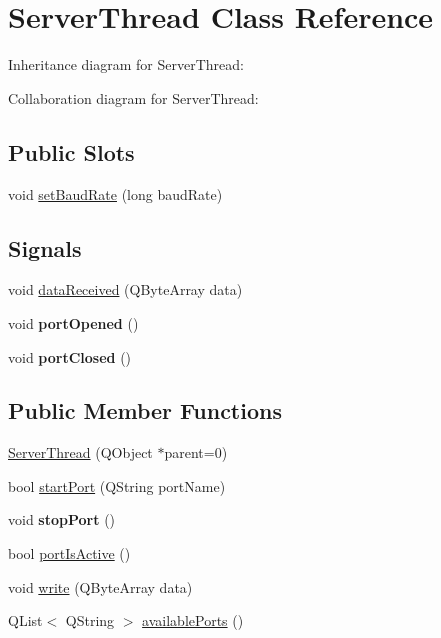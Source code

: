 \hypertarget{classServerThread}{\section{Server\+Thread Class Reference}
\label{classServerThread}
}


Inheritance diagram for Server\+Thread\+:


Collaboration diagram for Server\+Thread\+:
\subsection*{Public Slots}
\begin{DoxyCompactItemize}
\item 
void \hyperlink{classServerThread_a5a2fd84aec757a4475d9bb26ea53e896}{set\+Baud\+Rate} (long baud\+Rate)
\end{DoxyCompactItemize}
\subsection*{Signals}
\begin{DoxyCompactItemize}
\item 
void \hyperlink{classServerThread_af556f75e493771e636ffb39d5c7fcc6c}{data\+Received} (Q\+Byte\+Array data)
\item 
\hypertarget{classServerThread_ada857cd9723bf0b135b7e03bef2bb1f5}{void {\bfseries port\+Opened} ()}\label{classServerThread_ada857cd9723bf0b135b7e03bef2bb1f5}

\item 
\hypertarget{classServerThread_a500d464163002ba2c87670af08ecbd40}{void {\bfseries port\+Closed} ()}\label{classServerThread_a500d464163002ba2c87670af08ecbd40}

\end{DoxyCompactItemize}
\subsection*{Public Member Functions}
\begin{DoxyCompactItemize}
\item 
\hyperlink{classServerThread_a552106ab27d9cff73b7ed8bb28b63171}{Server\+Thread} (Q\+Object $\ast$parent=0)
\item 
bool \hyperlink{classServerThread_a9cdcb660181ea510dd011e709abeb130}{start\+Port} (Q\+String port\+Name)
\item 
\hypertarget{classServerThread_a030b9a76d680d92bcab92bebf8ac3ed8}{void {\bfseries stop\+Port} ()}\label{classServerThread_a030b9a76d680d92bcab92bebf8ac3ed8}

\item 
bool \hyperlink{classServerThread_ae4a93a55ae78933c32d2c56c8d7faac0}{port\+Is\+Active} ()
\item 
void \hyperlink{classServerThread_acafe1f651556eddc49b97b40b9d526f0}{write} (Q\+Byte\+Array data)
\item 
Q\+List$<$ Q\+String $>$ \hyperlink{classServerThread_a8647882b35b461817de51025bd97b5b9}{available\+Ports} ()
\end{DoxyCompactItemize}
